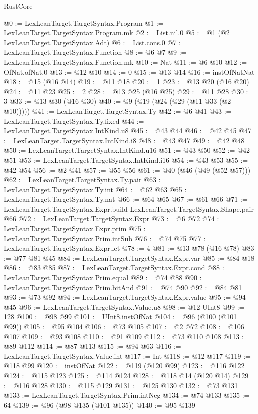\begin{lexlean}{RustCore}
\begin{coremodule}
@0 := LexLeanTarget.TargetSyntax.Program
@1 := LexLeanTarget.TargetSyntax.Program.mk
@2 := List.nil.{0}
@5 := @1 (@2 LexLeanTarget.TargetSyntax.Adt)
@6 := List.cons.{0}
@7 := LexLeanTarget.TargetSyntax.Function
@8 := @6 @7
@9 := LexLeanTarget.TargetSyntax.Function.mk
@10 := Nat
@11 := @6 @10
@12 := OfNat.ofNat.{0}
@13 := @12 @10
@14 := 0
@15 := @13 @14
@16 := instOfNatNat
@18 := @15 (@16 @14)
@19 := @11 @18
@20 := 1
@23 := @13 @20 (@16 @20)
@24 := @11 @23
@25 := 2
@28 := @13 @25 (@16 @25)
@29 := @11 @28
@30 := 3
@33 := @13 @30 (@16 @30)
@40 := @9 (@19 (@24 (@29 (@11 @33 (@2 @10)))))
@41 := LexLeanTarget.TargetSyntax.Ty
@42 := @6 @41
@43 := LexLeanTarget.TargetSyntax.Ty.fixed
@44 := LexLeanTarget.TargetSyntax.IntKind.u8
@45 := @43 @44
@46 := @42 @45
@47 := LexLeanTarget.TargetSyntax.IntKind.i8
@48 := @43 @47
@49 := @42 @48
@50 := LexLeanTarget.TargetSyntax.IntKind.u16
@51 := @43 @50
@52 := @42 @51
@53 := LexLeanTarget.TargetSyntax.IntKind.i16
@54 := @43 @53
@55 := @42 @54
@56 := @2 @41
@57 := @55 @56
@61 := @40 (@46 (@49 (@52 @57)))
@62 := LexLeanTarget.TargetSyntax.Ty.pair
@63 := LexLeanTarget.TargetSyntax.Ty.int
@64 := @62 @63
@65 := LexLeanTarget.TargetSyntax.Ty.nat
@66 := @64 @65
@67 := @61 @66
@71 := LexLeanTarget.TargetSyntax.Expr.build LexLeanTarget.TargetSyntax.Shape.pair @66
@72 := LexLeanTarget.TargetSyntax.Expr
@73 := @6 @72
@74 := LexLeanTarget.TargetSyntax.Expr.prim
@75 := LexLeanTarget.TargetSyntax.Prim.intSub
@76 := @74 @75
@77 := LexLeanTarget.TargetSyntax.Expr.let
@78 := 4
@81 := @13 @78 (@16 @78)
@83 := @77 @81 @45
@84 := LexLeanTarget.TargetSyntax.Expr.var
@85 := @84 @18
@86 := @83 @85
@87 := LexLeanTarget.TargetSyntax.Expr.cond
@88 := LexLeanTarget.TargetSyntax.Prim.equal
@89 := @74 @88
@90 := LexLeanTarget.TargetSyntax.Prim.bitAnd
@91 := @74 @90
@92 := @84 @81
@93 := @73 @92
@94 := LexLeanTarget.TargetSyntax.Expr.value
@95 := @94 @45
@96 := LexLeanTarget.TargetSyntax.Value.u8
@98 := @12 UInt8
@99 := 128
@100 := @98 @99
@101 := UInt8.instOfNat
@104 := @96 (@100 (@101 @99))
@105 := @95 @104
@106 := @73 @105
@107 := @2 @72
@108 := @106 @107
@109 := @93 @108
@110 := @91 @109
@112 := @73 @110 @108
@113 := @89 @112
@114 := @87 @113
@115 := @94 @63
@116 := LexLeanTarget.TargetSyntax.Value.int
@117 := Int
@118 := @12 @117
@119 := @118 @99
@120 := instOfNat
@122 := @119 (@120 @99)
@123 := @116 @122
@124 := @115 @123
@125 := @114 @124
@128 := @118 @14 (@120 @14)
@129 := @116 @128
@130 := @115 @129
@131 := @125 @130
@132 := @73 @131
@133 := LexLeanTarget.TargetSyntax.Prim.intNeg
@134 := @74 @133
@135 := 64
@139 := @96 (@98 @135 (@101 @135))
@140 := @95 @139

\end{coremodule}
\end{lexlean}

